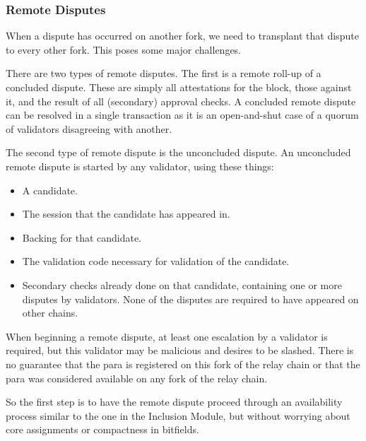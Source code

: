 \subsubsection{Remote Disputes}

When a dispute has occurred on another fork, we need to transplant that dispute to every other fork. This poses some major challenges.
\newline

There are two types of remote disputes. The first is a remote roll-up of a concluded dispute. These are simply all attestations for the block, those against it, and the result of all (secondary) approval checks. A concluded remote dispute can be resolved in a single transaction as it is an open-and-shut case of a quorum of validators disagreeing with another.
\newline

The second type of remote dispute is the unconcluded dispute. An unconcluded remote dispute is started by any validator, using these things:

\begin{itemize}
    \item A candidate.
    \item The session that the candidate has appeared in.
    \item Backing for that candidate.
    \item The validation code necessary for validation of the candidate.
    \item Secondary checks already done on that candidate, containing one or
    more disputes by validators. None of the disputes are required to have
    appeared on other chains. 
\end{itemize}

When beginning a remote dispute, at least one escalation by a validator is
required, but this validator may be malicious and desires to be slashed. There
is no guarantee that the para is registered on this fork of the relay chain or
that the para was considered available on any fork of the relay chain.
\newline

So the first step is to have the remote dispute proceed through an availability
process similar to the one in the Inclusion Module, but without worrying about
core assignments or compactness in bitfields.
\newline

